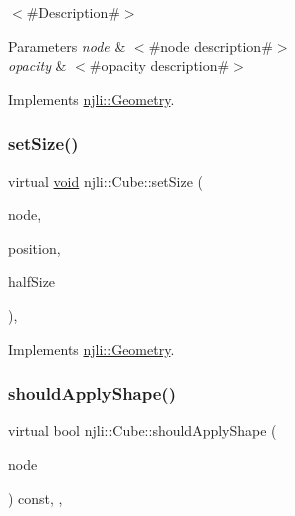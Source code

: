 $<$\#\+Description\#$>$


\begin{DoxyParams}{Parameters}
{\em node} & $<$\#node description\#$>$ \\
\hline
{\em opacity} & $<$\#opacity description\#$>$ \\
\hline
\end{DoxyParams}


Implements \mbox{\hyperlink{classnjli_1_1_geometry_ad4f8c2a3b873a63ee62c87d512b9540d}{njli\+::\+Geometry}}.

\mbox{\label{classnjli_1_1_cube_a935f8c1119991d17858a3982c33912b6}} 
\subsubsection{\texorpdfstring{set\+Size()}{setSize()}}
{\footnotesize\ttfamily virtual \mbox{\hyperlink{_thread_8h_af1e856da2e658414cb2456cb6f7ebc66}{void}} njli\+::\+Cube\+::set\+Size (\begin{DoxyParamCaption}\item[{\mbox{\hyperlink{classnjli_1_1_node}{Node}} $\ast$}]{node,  }\item[{const bt\+Vector3 \&}]{position,  }\item[{const \mbox{\hyperlink{_util_8h_a5f6906312a689f27d70e9d086649d3fd}{f32}}}]{half\+Size }\end{DoxyParamCaption})\hspace{0.3cm}{\ttfamily [protected]}, {\ttfamily [virtual]}}



Implements \mbox{\hyperlink{classnjli_1_1_geometry_a64c12722f84add665776c2b9400108fd}{njli\+::\+Geometry}}.

\mbox{\label{classnjli_1_1_cube_ae9b5fd0928a0e47ad37114ca9da6f41a}} 
\subsubsection{\texorpdfstring{should\+Apply\+Shape()}{shouldApplyShape()}}
{\footnotesize\ttfamily virtual bool njli\+::\+Cube\+::should\+Apply\+Shape (\begin{DoxyParamCaption}\item[{\mbox{\hyperlink{classnjli_1_1_node}{Node}} $\ast$}]{node }\end{DoxyParamCaption}) const\hspace{0.3cm}{\ttfamily [inline]}, {\ttfamily [protected]}, {\ttfamily [virtual]}}



